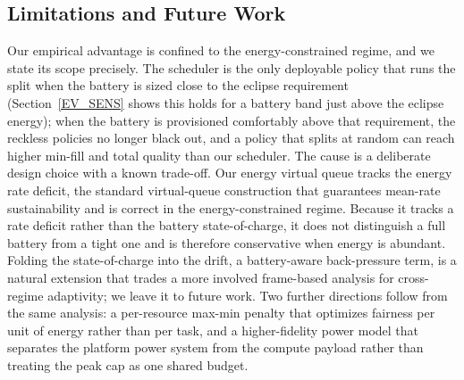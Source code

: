 \subsection{Limitations and Future Work}\label{EV_LIM}
Our empirical advantage is confined to the energy-constrained regime, and we state its scope
precisely. The scheduler is the only deployable policy that runs the split when the battery is
sized close to the eclipse requirement (Section~\ref{EV_SENS} shows this holds for a battery
band just above the eclipse energy); when the battery is provisioned comfortably above that
requirement, the reckless policies no longer black out, and a policy that splits at random can
reach higher min-fill and total quality than our scheduler. The cause is a deliberate design
choice with a known trade-off. Our energy virtual queue tracks the energy rate deficit, the
standard virtual-queue construction that guarantees mean-rate sustainability and is correct in
the energy-constrained regime. Because it tracks a rate deficit rather than the battery
state-of-charge, it does not distinguish a full battery from a tight one and is therefore
conservative when energy is abundant. Folding the state-of-charge into the drift, a
battery-aware back-pressure term, is a natural extension that trades a more involved
frame-based analysis for cross-regime adaptivity; we leave it to future work. Two further directions follow from the same analysis: a
per-resource max-min penalty that optimizes fairness per unit of energy rather than per task,
and a higher-fidelity power model that separates the platform power system from the compute
payload rather than treating the peak cap as one shared budget.
